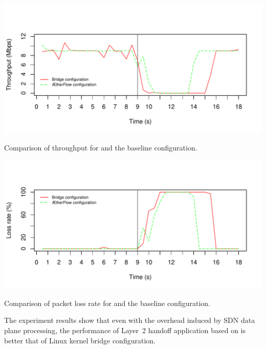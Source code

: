\begin{table}
\centering
\includegraphics[width=.8\textwidth]{figures/throughput}
\caption{Comparison of throughput for \aetherflow and the baseline configuration.} %
\label{fig:throughput}
\end{table}

\begin{table}
\centering
\includegraphics[width=.8\textwidth]{figures/loss}
\caption{Comparison of packet loss rate for \aetherflow and the baseline configuration.} %
\label{fig:loss}
\end{table}

The experiment results show that even with the overhead induced by SDN data plane processing, the performance of Layer~2 handoff application based
on \aetherflow is better that of Linux kernel bridge configuration. %




